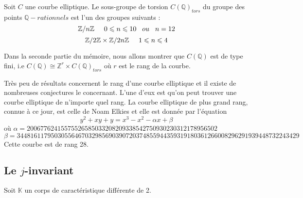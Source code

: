 \documentclass[a4paper]{article}
\begin{document}
\begin{theorem}
Soit $C$ une courbe elliptique.
Le sous-groupe de torsion $C(\mathbb{Q})_{tors}$ du groupe des points $\mathbb{Q}-rationnels$ est l'un des groupes suivants :
\begin{equation*}
\mathbb{Z}/n\mathbb{Z} \hspace{0.5cm} 0 \leqslant n \leqslant 10 \hspace{0.3cm} ou\hspace{0.3cm} n=12
\end{equation*}
\begin{equation*}
\mathbb{Z}/2\mathbb{Z} \times \mathbb{Z}/2n\mathbb{Z} \hspace{0.5cm}  1\leqslant n \leqslant 4
\end{equation*}
\end{theorem}

\noindent Dans la seconde partie du mémoire, nous allons montrer que $C(\mathbb{Q})$ est de type fini, i.e $C(\mathbb{Q}) \cong \mathbb{Z}^r \times C(\mathbb{Q})_{tors}$ où $r$ est le rang de la courbe. 

\begin{rem}
\normalfont Très peu de résultats concernent le rang d'une courbe elliptique et il existe de nombreuses conjectures le concernant. L'une d'eux est qu'on peut trouver une courbe elliptique de n'importe quel rang.
La courbe elliptique de plus grand rang, connue à ce jour, est celle de Noam Elkies et elle est donnée par l'équation 
\begin{equation*}
y^2 + xy + y = x^3 - x^2 - \alpha x  
+ \beta 
\end{equation*}
où $\alpha=20067762415575526585033208209338542750930230312178956502$
\\$\beta=34481611795030556467032985690390720374855944359319180361266008296291939448732243429$
Cette courbe est de rang 28.
\end{rem}


\subsection{Le $j$-invariant}
\noindent Soit $\mathbb{K}$ un corps de caractéristique différente de 2.
\end{document}
